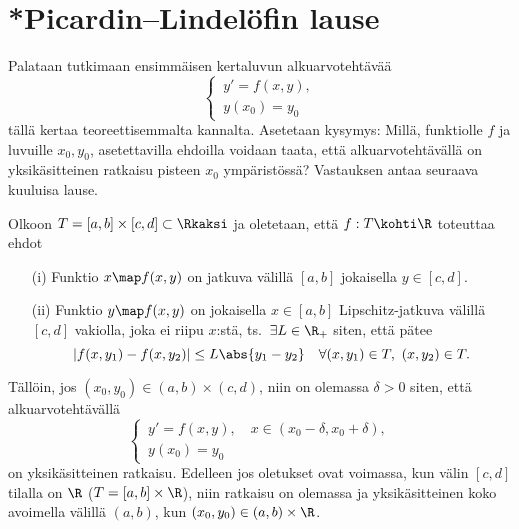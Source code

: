 \section{*Picardin--Lindelöfin lause} \label{Picard-Lindelöfin lause}
\alku

Palataan tutkimaan ensimmäisen kertaluvun alkuarvotehtävää
\begin{equation} \label{Picard-1}
\begin{cases} \,y'=f(x,y), \\ \,y(x_0)=y_0 \end{cases}
\end{equation}
tällä kertaa teoreettisemmalta kannalta. Asetetaan kysymys: Millä, funktiolle $f$ ja luvuille
$x_0,y_0$, asetettavilla ehdoilla voidaan taata, että alkuarvotehtävällä on yksikäsitteinen
ratkaisu pisteen $x_0$ ympäristössä? Vastauksen antaa seuraava kuuluisa lause.
\begin{*Lause} \label{picard-lindelöf} 
%
 Olkoon $T=[a,b]\times [c,d]\subset\Rkaksi$ ja
oletetaan, että $f:T\kohti\R$ toteuttaa ehdot
\begin{itemize}
\item[(i)]  Funktio $x \map f(x,y)$ on jatkuva välillä $[a,b]$ jokaisella $y\in[c,d]$.
\item[(ii)] Funktio $y \map f(x,y)$ on jokaisella $x\in[a,b]$ Lipschitz-jatkuva välillä $[c,d]$
            vakiolla, joka ei riipu $x$:stä, ts.\ $\exists L\in\R_+$ siten, että pätee
            \[
            |f(x,y_1)-f(x,y_2)| \le L\abs{y_1-y_2} \quad\forall (x,y_1)\in T, \ (x,y_2)\in T.
            \]
\end{itemize}
Tällöin, jos $(x_0,y_0)\in(a,b)\times(c,d)$, niin on olemassa $\delta>0$ siten, että
alkuarvotehtävällä
\[
\begin{cases} \,y'=f(x,y),\quad x\in (x_0-\delta,x_0+\delta), \\ \,y(x_0)=y_0 \end{cases}
\]
on yksikäsitteinen ratkaisu. Edelleen jos oletukset ovat voimassa, kun välin $[c,d]$ tilalla
on $\R$ ($T=[a,b]\times\R$), niin ratkaisu on olemassa ja yksikäsitteinen koko avoimella
välillä $(a,b)$, kun $(x_0,y_0)\in(a,b)\times\R$.
\end{*Lause}

